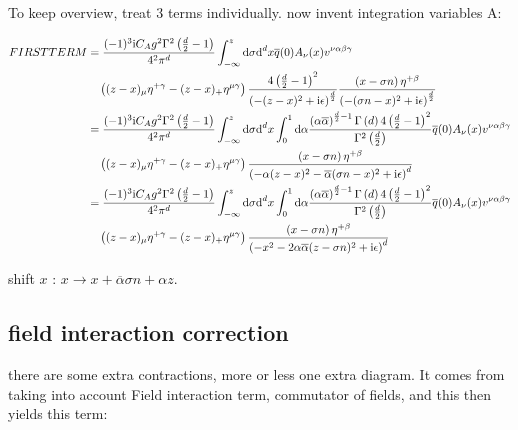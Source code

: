 To keep overview, treat 3 terms individually.
now invent integration variables
A:

\begin{align}
	FIRSTTERM
	&=
	\frac{(-1)^3 \text{i} C_A g^2 \Gamma^2\left( \frac{d}{2} -1\right)}{4^2\pi^{d}} \int_{-\infty}^z \text{d} \sigma \text{d} ^d x  \overline q(0) A_\nu (x) v^{\nu\alpha\beta\gamma}
	\\&~~~
	\left( (z-x)_\mu \eta^{+ \gamma} - (z-x)_+ \eta^{\mu \gamma} \right) \frac{4\left(\frac{d}{2}-1\right)^2}{ \left(-(z-x)^2+\text{i}\epsilon\right)^{\frac{d}{2}}} \frac{\left( x- \sigma n \right)\eta^{+\beta}}{ \left(-(\sigma n -x)^2+\text{i}\epsilon\right)^{\frac{d}{2}}}
	\\
	&=
	\frac{(-1)^3 \text{i} C_A g^2 \Gamma^2\left( \frac{d}{2} -1\right)}{4^2\pi^{d}} \int_{-\infty}^z \text{d} \sigma \text{d} ^d x \int_0^1 \text{d} \alpha \frac{\left(\alpha\overline\alpha\right)^{\frac{d}{2}-1}\Gamma\left(d\right)4\left(\frac{d}{2}-1\right)^2}{\Gamma^2\left(\frac{d}{2}\right)} \overline q(0) A_\nu (x) v^{\nu\alpha\beta\gamma}
	\\&~~~
	\left( (z-x)_\mu \eta^{+ \gamma} - (z-x)_+ \eta^{\mu \gamma} \right)  \frac{\left( x- \sigma n \right)\eta^{+\beta}}{ \left(-\alpha(z-x)^2-\overline\alpha(\sigma n -x)^2+\text{i}\epsilon\right)^{d}}
	\\
	&=
	\frac{(-1)^3 \text{i} C_A g^2 \Gamma^2\left( \frac{d}{2} -1\right)}{4^2\pi^{d}} \int_{-\infty}^z \text{d} \sigma \text{d} ^d x \int_0^1 \text{d} \alpha \frac{\left(\alpha\overline\alpha\right)^{\frac{d}{2}-1}\Gamma\left(d\right)4\left(\frac{d}{2}-1\right)^2}{\Gamma^2\left(\frac{d}{2}\right)} \overline q(0) A_\nu (x) v^{\nu\alpha\beta\gamma}
	\\&~~~
	\left( (z-x)_\mu \eta^{+ \gamma} - (z-x)_+ \eta^{\mu \gamma} \right)  \frac{\left( x- \sigma n \right)\eta^{+\beta}}{ \left(-x^2 - 2\alpha\overline \alpha(z-\sigma n)^2+\text{i}\epsilon\right)^{d}}
\end{align}

shift $x$ : $x \rightarrow x + \overline \alpha \sigma n + \alpha z$.

\subsection{field interaction correction}

there are some extra contractions, more or less one extra diagram. It comes from taking into account Field interaction term, commutator of fields, and this then yields this term: 

